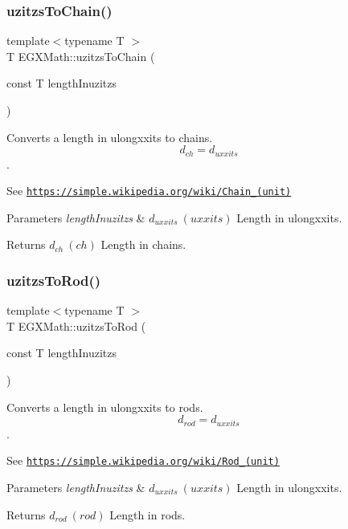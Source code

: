 \subsubsection{\texorpdfstring{uzitzs\+To\+Chain()}{uzitzsToChain()}}
{\footnotesize\ttfamily template$<$typename T $>$ \\
T E\+G\+X\+Math\+::uzitzs\+To\+Chain (\begin{DoxyParamCaption}\item[{const T}]{length\+Inuzitzs }\end{DoxyParamCaption})}



Converts a length in ulongxxits to chains. \[ d_{ch}=d_{uxxits} \]. 

See \href{https://simple.wikipedia.org/wiki/Chain_(unit)}{\tt https\+://simple.\+wikipedia.\+org/wiki/\+Chain\+\_\+(unit)} 
\begin{DoxyParams}{Parameters}
{\em length\+Inuzitzs} & $ d_{uxxits}\ (uxxits)$ Length in ulongxxits. \\
\hline
\end{DoxyParams}
\begin{DoxyReturn}{Returns}
$ d_{ch}\ (ch)$ Length in chains. 
\end{DoxyReturn}
\mbox{\label{group___e_g_x_math-_conversions-_length_conversions-uzitzs-_surveyors_gaf6062ab067930d296074de9e8301871d}} 
\subsubsection{\texorpdfstring{uzitzs\+To\+Rod()}{uzitzsToRod()}}
{\footnotesize\ttfamily template$<$typename T $>$ \\
T E\+G\+X\+Math\+::uzitzs\+To\+Rod (\begin{DoxyParamCaption}\item[{const T}]{length\+Inuzitzs }\end{DoxyParamCaption})}



Converts a length in ulongxxits to rods. \[ d_{rod}=d_{uxxits} \]. 

See \href{https://simple.wikipedia.org/wiki/Rod_(unit)}{\tt https\+://simple.\+wikipedia.\+org/wiki/\+Rod\+\_\+(unit)} 
\begin{DoxyParams}{Parameters}
{\em length\+Inuzitzs} & $ d_{uxxits}\ (uxxits)$ Length in ulongxxits. \\
\hline
\end{DoxyParams}
\begin{DoxyReturn}{Returns}
$ d_{rod}\ (rod)$ Length in rods. 
\end{DoxyReturn}
